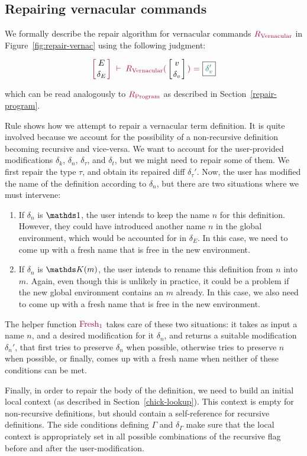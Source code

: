 \subsection{Repairing vernacular commands} \label{repair-vernacular}

We formally describe the repair algorithm for vernacular commands
$\textcolor{purple}{R_{\text{Vernacular}}}$ in Figure~\ref{fig:repair-vernac} using the following
judgment:

{
  \[
    {\turnstile
      {\denv{E}{\delta_E}}
      {\repairVernac{v}{\delta_v}{\delta_v'}}
    }
  \]
}

\noindent which can be read analogously to $\textcolor{purple}{R_{\text{Program}}}$ as described in
Section~\ref{repair-program}.



Rule  shows how we attempt to repair a vernacular
term definition.  It is quite involved because we account for the possibility of
a non-recursive definition becoming recursive and vice-versa.  We want to
account for the user-provided modifications $\delta_k$, $\delta_n$,
$\delta_\tau$, and $\delta_t$, but we might need to repair some of them.  We
first repair the type $\tau$, and obtain its repaired diff $\delta_\tau'$.  Now,
the user has modified the name of the definition according to $\delta_n$, but
there are two situations where we must intervene:

\begin{enumerate}

\item If $\delta_n$ is $\MathSame$, the user intends to keep the name $n$ for
this definition.  However, they could have introduced another name $n$ in the
global environment, which would be accounted for in $\delta_E$.  In this case,
we need to come up with a fresh name that is free in the new environment.

\item If $\delta_n$ is $\MathReplace{m}$, the user intends to rename this
definition from $n$ into $m$.  Again, even though this is unlikely in practice,
it could be a problem if the new global environment contains an $m$ already.  In
this case, we also need to come up with a fresh name that is free in the new
environment.

\end{enumerate}

\noindent The helper function $\textcolor{purple}{\text{Fresh}_1}$ takes care of these two situations:
it takes as input a name $n$, and a desired modification for it $\delta_n$, and
returns a suitable modification $\delta_n'$, that first tries to preserve
$\delta_n$ when possible, otherwise tries to preserve $n$ when possible, or
finally, comes up with a fresh name when neither of these conditions can be met.

Finally, in order to repair the body of the definition, we need to build an
initial local context (as described in Section~\ref{chick-lookup}).  This
context is empty for non-recursive definitions, but should contain a
self-reference for recursive definitions.  The side conditions defining $\Gamma$
and $\delta_\Gamma$ make sure that the local context is appropriately set in all
possible combinations of the recursive flag before and after the
user-modification.
